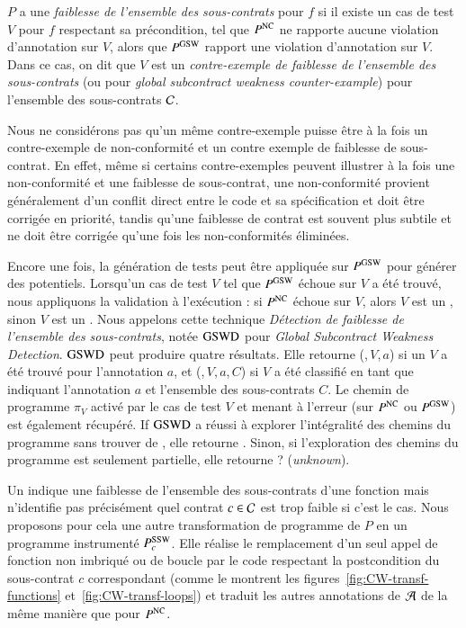 \begin{definition} 
  \label{def:GSW}
  $P$ a une \emph{faiblesse de l'ensemble des sous-contrats} pour $f$  si il
  existe un cas de test $V$ pour $f$ respectant sa précondition, tel que
  $P^{\mathrm{NC}}$ ne rapporte aucune violation d'annotation sur $V$, alors que
  $P^{\mathrm{GSW}}$ rapport une violation d'annotation sur $V$.
  Dans ce cas, on dit que $V$ est un
  \emph{contre-exemple de faiblesse de l'ensemble des sous-contrats} (ou \GSWCE
  pour {\em global subcontract weakness counter-example}) pour l'ensemble des
  sous-contrats ${\mathcal{C}}$.
\end{definition}

Nous ne considérons pas qu'un même contre-exemple puisse être à la fois un
contre-exemple de non-conformité et un contre exemple de faiblesse de
sous-contrat.
En effet, même si certains contre-exemples peuvent illustrer à la fois une
non-conformité et une faiblesse de sous-contrat, une non-conformité provient
généralement d'un conflit direct entre le code et sa spécification et doit être
corrigée en priorité, tandis qu'une faiblesse de contrat est souvent plus
subtile et ne doit être corrigée qu'une fois les non-conformités éliminées.

Encore une fois, la génération de tests peut être appliquée sur $P^{\mathrm{GSW}}$ pour
générer des \GSWCE potentiels.
Lorsqu'un cas de test $V$ tel que $P^{\mathrm{GSW}}$ échoue sur $V$ a été trouvé, nous
appliquons la validation à l'exécution :
si $P^{\mathrm{NC}}$ échoue sur $V$, alors $V$ est un \NCCE, sinon $V$ est un \GSWCE.
Nous appelons cette technique
\emph{Détection de faiblesse de l'ensemble des sous-contrats}, notée $\mathrm{GSWD}$
pour \textit{Global Subcontract Weakness Detection}.
$\mathrm{GSWD}$ peut produire quatre résultats.
Elle retourne (\nc,\,$V$,\,$a$) si un \NCCE $V$ a été trouvé pour l'annotation
$a$, et (\cw,\,$V$,\,$a$,\,$C$) si $V$ a été classifié en tant que \SWCE
indiquant l'annotation $a$ et l'ensemble des sous-contrats $C$.
Le chemin de programme $\pi_V$ activé par le cas de test $V$ et menant à
l'erreur (sur $P^{\mathrm{NC}}$ ou $P^{\mathrm{GSW}}$) est également récupéré.
If $\mathrm{GSWD}$ a réussi à explorer l'intégralité des chemins du programme sans
trouver de \GSWCE, elle retourne \no.
Sinon, si l'exploration des chemins du programme est seulement partielle, elle
retourne \textsf{?} ({\em unknown}).

Un \GSWCE indique une faiblesse de l'ensemble des sous-contrats d'une fonction
mais n'identifie pas précisément quel contrat $c\in{\ensuremath\mathcal{C}}$ est trop faible si
c'est le cas.
Nous proposons pour cela une autre transformation de programme de $P$ en un
programme instrumenté $P_c^{\mathrm{SSW}}$.
Elle réalise le remplacement d'un seul appel de fonction non imbriqué ou de
boucle par le code respectant la postcondition du sous-contrat $c$ correspondant
(comme le montrent les figures~\ref{fig:CW-transf-functions}
et~\ref{fig:CW-transf-loops}) et traduit les autres annotations de ${\mathcal{A}}$ de la
même manière que pour $P^{\mathrm{NC}}$.


